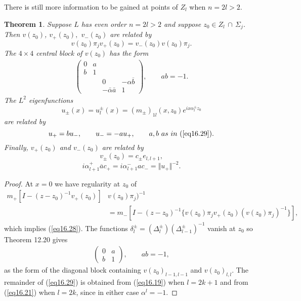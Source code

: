 \documentclass{surv-l}
\theoremstyle{plain}
\newtheorem{theorem}{Theorem}[section]
\theoremstyle{definition}
\numberwithin{equation}{chapter}
\begin{document}
There is still more information to be gained at points of $Z_{l}$ when $n=2l>2$.
\setcounter{theorem}{26}
\begin{theorem}\label{them16.27}
Suppose $L$  has even order $n=2l>2$ and suppose $ z_{0}\in Z_{l}\,\cap\,\Sigma_{j}$. Then $v(z_{0})$, $v_{+}(z_{0}),$ $v_{-}(z_{0})$ are related by
\setcounter{equation}{27}
\begin{equation}\label{eq16.28}
v(z_{0})\pi_{j}v_{+}(z_{0})=v_{-}(z_{0})v(z_{0})\pi_{j}.
\end{equation}
The $4\times 4$ central block of $v(z_{0})$ has the form
\begin{align}\label{eq16.29}
\left(\begin{array}{cccc}
0 & a &   &\\
b & 1 &   &\\
& & 0 & -\alpha\overline{b} \\
& & -\bar{\alpha}\bar{a} & 1
\end{array}\right),\qquad ab=-1.
\end{align}
The $L^{2}$ eigenfunctions
\begin{equation}\label{eq16.30}
u_{\pm}(x)=u_{l}^{\pm}(x)=(m_{\pm})_{1l}(x, z_{0})e^{ix\alpha_{l}^{\pm}z_{0}}
\end{equation}
are related by
\begin{equation}\label{eq16.31}
u_{+}=bu_{-},\qquad u_{-}=-au_{+},\qquad a,b\ as\ in\ (\ref{eq16.29}).
\end{equation}
Finally, $v_{+}(z_{0})$ and $v_{-}(z_{0})$ are related by
\begin{equation}\label{eq16.32}
v_{\pm}(z_{0})=c_{\pm} e_{l,l+1},
\end{equation}
\begin{equation}\label{eq16.33}
i\alpha_{l+1}^{+}\overline{a}c_{+}=i\alpha_{l+1}^{-}ac_{-}=\Vert u_{+}\Vert^{-2}.
\end{equation}
\end{theorem}
\begin{proof}
At $x=0$ we have regularity at $z_{0}$ of
\begin{align*}
m_{+}[I- (z -z_{0})^{-1}v_{+}(z_{0})]&v(z_{0})\pi_{j})^{-1}\\
&=m_{-}[I-(z-z_{0})^{-1}\{v(z_{0})\pi_{j}v_{+}(z_{0})(v(z_{0})\pi_{j})^{-1}\}],
\end{align*}
which implies (\ref{eq16.28}). The functions $\delta_{l}^{\pm}=(\Delta_{l}^{\pm})(\Delta_{l-1}^{\pm})^{-1}$ vanish at $z_{0}$ so Theorem 12.20 gives
\begin{align*}
\left(\begin{array}{ll}
0 & a\\
b & 1
\end{array}\right),\qquad ab=-1,
\end{align*}
as the form of the diagonal block containing $v(z_{0})_{l-1,l-1}$ and $v(z_{0})_{l,l}$. The remainder of (\ref{eq16.29}) is obtained from (\ref{eq16.19}) when $l=2k+1$ and from (\ref{eq16.21}) when $l=2k$, since in either case $\alpha^{l}=-1$.
\end{proof}
\end{document}
